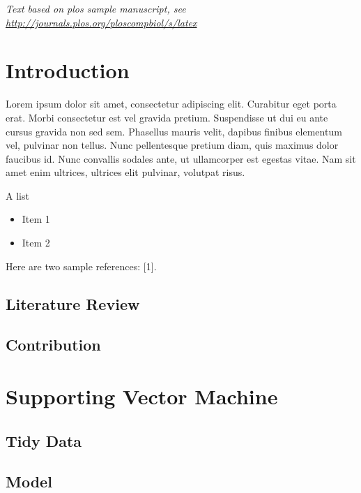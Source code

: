 \documentclass[10pt,letterpaper]{article}
\providecommand{\tightlist}{%
  \setlength{\itemsep}{0pt}\setlength{\parskip}{0pt}}
\begin{document}
\linenumbers

\emph{Text based on plos sample manuscript, see
\url{http://journals.plos.org/ploscompbiol/s/latex}}

\section{Introduction}\label{introduction}

Lorem ipsum dolor sit amet, consectetur adipiscing elit. Curabitur eget
porta erat. Morbi consectetur est vel gravida pretium. Suspendisse ut
dui eu ante cursus gravida non sed sem. Phasellus mauris velit, dapibus
finibus elementum vel, pulvinar non tellus. Nunc pellentesque pretium
diam, quis maximus dolor faucibus id. Nunc convallis sodales ante, ut
ullamcorper est egestas vitae. Nam sit amet enim ultrices, ultrices elit
pulvinar, volutpat risus.

A list

\begin{itemize}
\tightlist
\item
  Item 1
\item
  Item 2
\end{itemize}

Here are two sample references: {[}1{]}.

\subsection{Literature Review}\label{literature-review}

\subsection{Contribution}\label{contribution}

\section{Supporting Vector Machine}\label{supporting-vector-machine}

\subsection{Tidy Data}\label{tidy-data}

\subsection{Model}\label{model}
\end{document}
